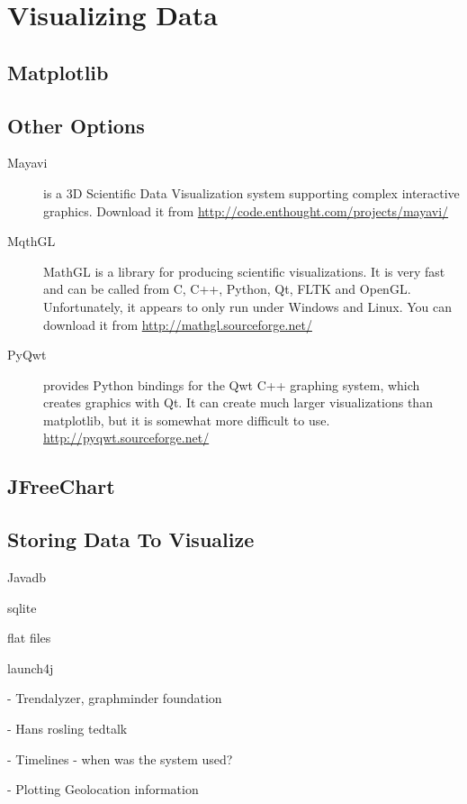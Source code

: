 \chapter{Visualizing Data}
\section{Matplotlib}

\section{Other Options}
\begin{description}
\item[Mayavi] is a 3D Scientific Data Visualization system supporting
  complex interactive graphics. Download it from \url{http://code.enthought.com/projects/mayavi/}
\item[MqthGL] MathGL is a library for producing scientific
  visualizations. It is very fast and can be called from C, C++,
  Python, Qt, FLTK and OpenGL. Unfortunately, it appears to only run
  under Windows and Linux. You can download it from \url{http://mathgl.sourceforge.net/}
\item[PyQwt] provides Python bindings for the Qwt C++ graphing system,
  which creates graphics with Qt. It can create much larger
  visualizations than matplotlib, but it is somewhat more difficult to
  use. \url{http://pyqwt.sourceforge.net/}
\end{description}

\section{JFreeChart}
\section{Storing Data To Visualize}

Javadb

sqlite

flat files

launch4j


- Trendalyzer, graphminder foundation

- Hans rosling tedtalk

- Timelines - when was the system used?

- Plotting Geolocation information

